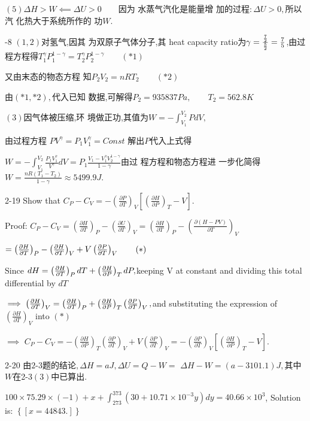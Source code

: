 \documentclass{ctexart}
\begin{document}
$\left( 5\right) \Delta H>W\impliedby \Delta U>0\qquad $因为%
水蒸气汽化是能量增%
加的过程$:\Delta U>0,$所以汽%
化热大于系统所作的%
功$W.$

-8 $\left( 1,2\right) $对氢气,因其%
为双原子气体分子,其%
heat capacity ratio为$\gamma =\frac{\frac{7}{2}}{\frac{5}{2}}=\frac{7}{%
5}$,由过程方程得$T_{1}^{\gamma
}P_{1}^{1-\gamma }=T_{2}^{\gamma }P_{2}^{1-\gamma }\qquad \left( \ast
1\right) $

又由末态的物态方程%
知\qquad $P_{2}V_{2}=nRT_{2}\qquad \left( \ast 2\right) $

由$\left( \ast 1,\ast 2\right) ,$代入已知%
数据,可解得\qquad $P_{2}=935837\unit{Pa}%
,\qquad T_{2}=562.8\unit{K}$

$\left( 3\right) $因气体被压缩,环%
境做正功,其值为$%
W=-\int_{V_{1}}^{V_{2}}PdV,$

由过程方程 $PV^{\gamma }=P_{1}V_{1}^{\gamma
}=Const$ 解出$P$代入上式得

$W=-\int_{V_{1}}^{V_{2}}\frac{P_{1}V_{1}^{\gamma }}{V^{\gamma }}dV=P_{1}%
\frac{V_{1}-V_{1}^{\gamma }V_{2}^{1-\gamma }}{1-\gamma }$由过%
程方程和物态方程进%
一步化简得$W=\frac{nR\left( T_{1}-T_{2}\right) 
}{1-\gamma }\approx 5499.9\unit{J}.$

2-19 Show that $C_{P}-C_{V}=-\left( \frac{\partial P}{\partial T}\right) _{V}%
\left[ \left( \frac{\partial H}{\partial P}\right) _{T}-V\right] .$

Proof: $C_{P}-C_{V}=\left( \frac{\partial H}{\partial T}\right) _{P}-\left( 
\frac{\partial U}{\partial T}\right) _{V}=\left( \frac{\partial H}{\partial T%
}\right) _{P}-\left( \frac{\partial \left( H-PV\right) }{\partial T}\right)
_{V}$

$=\left( \frac{\partial H}{\partial T}\right) _{P}-\left( \frac{\partial H}{%
\partial T}\right) _{V}+V\left( \frac{\partial P}{\partial T}\right)
_{V}\qquad \left( \ast \right) $

Since $dH=\left( \frac{\partial H}{\partial T}\right) _{P}dT+\left( \frac{%
\partial H}{\partial P}\right) _{T}dP,$keeping V at constant and dividing
this total differential by $dT$

$\implies \left( \frac{\partial H}{\partial T}\right) _{V}=\left( \frac{%
\partial H}{\partial T}\right) _{P}+\left( \frac{\partial H}{\partial P}%
\right) _{T}\left( \frac{\partial P}{\partial T}\right) _{V},$and
substituting the expression of $\left( \frac{\partial H}{\partial T}\right)
_{V}$ into $\left( \ast \right) $

$\implies $ $C_{P}-C_{V}=-\left( \frac{\partial H}{\partial P}\right)
_{T}\left( \frac{\partial P}{\partial T}\right) _{V}+V\left( \frac{\partial P%
}{\partial T}\right) _{V}=-\left( \frac{\partial P}{\partial T}\right) _{V}%
\left[ \left( \frac{\partial H}{\partial P}\right) _{T}-V\right] .$

2-20 由$2$-3题的结论$,\Delta H=a\unit{J}%
,\Delta U=Q-W=$ $\Delta H-W=\left( a-3101.1\right) \unit{J},$其中%
$W$在2-3$\left( 3\right) $中已算出$.$

$100\times 75.29\times (-1)+x+\int_{273}^{373}(30+10.71\times
10^{-3}y)dy=40.66\times 10^{3}$, Solution is: $\left\{ \left[ x=44843.\right]
\right\} $
\end{document}
